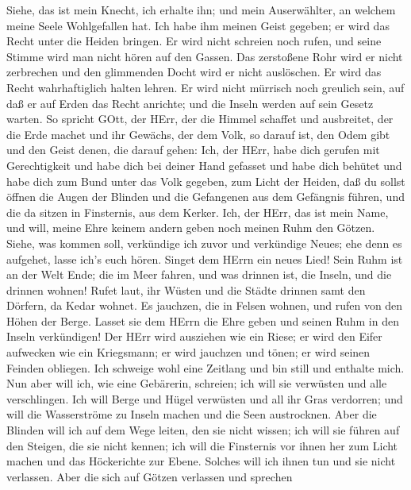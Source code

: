  Siehe, das ist mein Knecht, ich erhalte ihn; und mein
Auserwählter, an welchem meine Seele Wohlgefallen hat. Ich habe ihm
meinen Geist gegeben; er wird das Recht unter die Heiden bringen.
 Er wird nicht schreien noch rufen, und seine Stimme wird
man nicht hören auf den Gassen.  Das zerstoßene Rohr wird er
nicht zerbrechen und den glimmenden Docht wird er nicht auslöschen. Er
wird das Recht wahrhaftiglich halten lehren.  Er wird nicht
mürrisch noch greulich sein, auf daß er auf Erden das Recht anrichte;
und die Inseln werden auf sein Gesetz warten.  So spricht
GOtt, der HErr, der die Himmel schaffet und ausbreitet, der die Erde
machet und ihr Gewächs, der dem Volk, so darauf ist, den Odem gibt und
den Geist denen, die darauf gehen:  Ich, der HErr, habe dich
gerufen mit Gerechtigkeit und habe dich bei deiner Hand gefasset und
habe dich behütet und habe dich zum Bund unter das Volk gegeben, zum
Licht der Heiden,  daß du sollst öffnen die Augen der
Blinden und die Gefangenen aus dem Gefängnis führen, und die da sitzen
in Finsternis, aus dem Kerker.  Ich, der HErr, das ist mein
Name, und will, meine Ehre keinem andern geben noch meinen Ruhm den
Götzen.  Siehe, was kommen soll, verkündige ich zuvor und
verkündige Neues; ehe denn es aufgehet, lasse ich's euch hören.
 Singet dem HErrn ein neues Lied! Sein Ruhm ist an der Welt
Ende; die im Meer fahren, und was drinnen ist, die Inseln, und die
drinnen wohnen!  Rufet laut, ihr Wüsten und die Städte
drinnen samt den Dörfern, da Kedar wohnet. Es jauchzen, die in Felsen
wohnen, und rufen von den Höhen der Berge.  Lasset sie dem
HErrn die Ehre geben und seinen Ruhm in den Inseln verkündigen!
 Der HErr wird ausziehen wie ein Riese; er wird den Eifer
aufwecken wie ein Kriegsmann; er wird jauchzen und tönen; er wird seinen
Feinden obliegen.  Ich schweige wohl eine Zeitlang und bin
still und enthalte mich. Nun aber will ich, wie eine Gebärerin,
schreien; ich will sie verwüsten und alle verschlingen. 
Ich will Berge und Hügel verwüsten und all ihr Gras verdorren; und will
die Wasserströme zu Inseln machen und die Seen austrocknen.
 Aber die Blinden will ich auf dem Wege leiten, den sie
nicht wissen; ich will sie führen auf den Steigen, die sie nicht kennen;
ich will die Finsternis vor ihnen her zum Licht machen und das
Höckerichte zur Ebene. Solches will ich ihnen tun und sie nicht
verlassen.  Aber die sich auf Götzen verlassen und sprechen
